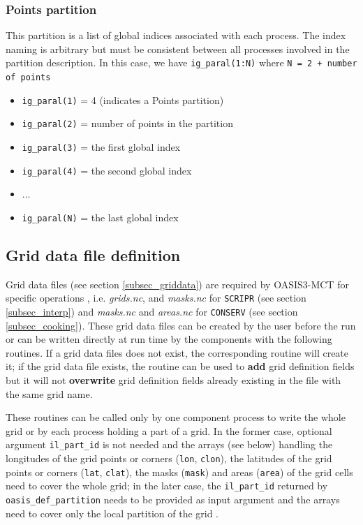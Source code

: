 \subsubsection{Points partition}

This partition is a list of global indices associated with each
process.  The index naming
is arbitrary but must be consistent between all processes involved
in the partition description.  In
this case, we have {\tt ig\_paral(1:N)} where {\tt N = 2 + number of
  points}

\begin{itemize}
\item {\tt ig\_paral(1)} = 4 (indicates a Points partition)
\item {\tt ig\_paral(2)} = number of points in the partition 
\item {\tt ig\_paral(3)} = the first global index
\item {\tt ig\_paral(4)} = the second global index
\item ...
\item {\tt ig\_paral(N)} = the last global index
\end{itemize}

\subsection{Grid data file definition}
\label{subsubsec_griddef}

Grid data files (see section \ref{subsec_griddata}) are required by OASIS3-MCT for specific operations , i.e.  {\em grids.nc}, and {\em masks.nc} for
{\tt SCRIPR} (see section \ref{subsec_interp}) and {\em masks.nc} and
{\em areas.nc} for {\tt CONSERV} (see section
\ref{subsec_cooking}). These grid data files can be created by the
user before the run or can be written directly at run time by the components with the following routines.
If a grid data files does not exist, the corresponding routine will create it; if the grid data file exists, the routine can be used to {\bf add} grid definition fields but it will not {\bf overwrite} grid definition fields already existing in the file with the same grid name. 

These routines can be called only by one component process to write the whole grid or by each process holding a part of a grid. In the former case, optional argument {\tt il\_part\_id} is not needed and the arrays (see below) handling the longitudes of the grid points or corners ({\tt lon}, {\tt clon}), the latitudes of the grid points or corners ({\tt lat}, {\tt clat}), the masks ({\tt mask}) and areas ({\tt area}) of the grid cells need to cover the whole grid; in the later case, the {\tt il\_part\_id} returned by {\tt oasis\_def\_partition} needs to be provided as input argument and the arrays need to cover only the local partition of the grid .

